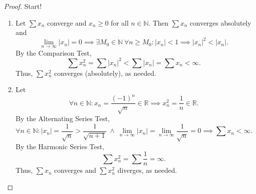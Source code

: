 \documentclass[12pt]{article}
\theoremstyle{definition}
\begin{document}
\begin{proof}
    Start! 
    \begin{enumerate}[label=\alph*)]
        \item Let \(\sum x_n\) converge and \(x_n \geq 0\) for all \(n \in \mathbb{N}\). Then \(\sum x_n\) converges absolutely and 
        \[
            \lim_{n \to \infty}\vert x_n \vert = 0 \implies \exists M_0 \in \mathbb{N} \ \forall n \geq M_0 : \vert x_n \vert < 1 \implies \vert x_n \vert^2 < \vert x_n \vert.
        \]
        By the Comparison Test,
        \[
            \sum x_n^2 = \sum \vert x_n \vert^2 < \sum \vert x_n \vert = \sum x_n < \infty. 
        \]
        Thus, \(\sum x_n^2\) converges (absolutely), as needed.  
        \item Let 
        \[
            \forall n \in \mathbb{N} : x_n = \frac{(-1)^n}{\sqrt{n}} \in \mathbb{R} \implies x_n^2 = \frac{1}{n} \in \mathbb{R}.
        \]
        By the Alternating Series Test,
        \[
            \forall n \in \mathbb{N} : \vert x_n \vert = \frac{1}{\sqrt{n}} > \frac{1}{\sqrt{n + 1}} \ \land \ \lim_{n \to \infty}\vert x_n \vert = \lim_{n \to \infty}\frac{1}{\sqrt{n}} = 0 \implies \sum x_n < \infty.
        \]
        By the Harmonic Series Test,
        \[
            \sum x_n^2 = \sum \frac{1}{n} = \infty.
        \]
        Thus, \(\sum x_n\) converges and \(\sum x_n^2\) diverges, as needed.
    \end{enumerate}
\end{proof}
\end{document}
